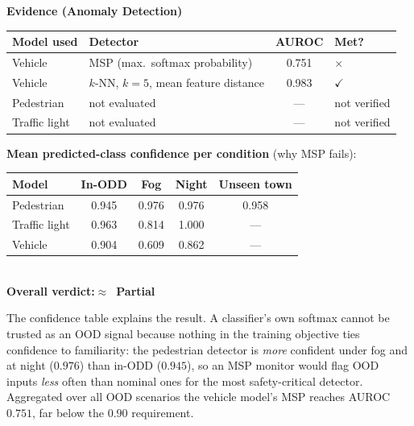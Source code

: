 \documentclass[a4paper,12pt]{article}
\makeatletter
\newcommand{\verdictpartial}{\textbf{\color{mls@yellow}$\approx$~Partial}}
\newcommand{\verdictline}[1]{\textbf{Overall verdict:}\quad #1}
\newcommand{\yes}{{\color{mls@green}$\checkmark$}}
\newcommand{\no}{{\color{mls@red}$\times$}}
\makeatother
\begin{document}
\begin{mdframed}[style=evidencestyle]
\textbf{Evidence (Anomaly Detection)}\\

\centering
\small
\renewcommand{\arraystretch}{1.15}
\begin{tabular}{@{}llcl@{}}
\toprule
\textbf{Model used} & \textbf{Detector} & \textbf{AUROC} & \textbf{Met?} \\
\midrule
Vehicle       & MSP (max.\ softmax probability)               & 0.751 & \no \\
Vehicle       & $k$-NN, $k=5$, mean feature distance          & 0.983 & \yes \\
Pedestrian    & not evaluated                                 & ---   & not verified \\
Traffic light & not evaluated                                 & ---   & not verified \\
\bottomrule
\end{tabular}

\bigskip
\textbf{Mean predicted-class confidence per condition} (why MSP fails):\\

\begin{tabular}{@{}lcccc@{}}
\toprule
\textbf{Model} & \textbf{In-ODD} & \textbf{Fog} & \textbf{Night} & \textbf{Unseen town} \\
\midrule
Pedestrian    & 0.945 & 0.976 & 0.976 & 0.958 \\
Traffic light & 0.963 & 0.814 & 1.000 & --- \\
Vehicle       & 0.904 & 0.609 & 0.862 & --- \\
\bottomrule
\end{tabular}\\

\bigskip
\verdictline{\verdictpartial}
\end{mdframed}

\noindent The confidence table explains the result. A classifier's own softmax cannot be
trusted as an OOD signal because nothing in the training objective ties confidence to
familiarity: the pedestrian detector is \emph{more} confident under fog and at night
($0.976$) than in-ODD ($0.945$), so an MSP monitor would flag OOD inputs \emph{less} often
than nominal ones for the most safety-critical detector. Aggregated over all OOD scenarios
the vehicle model's MSP reaches AUROC $0.751$, far below the $0.90$ requirement.
\end{document}
